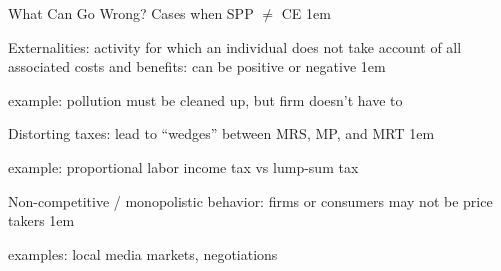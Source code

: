 \documentclass[11pt,aspectratio=43]{beamer}
\let\olditemize=\itemize
\let\endolditemize=\enditemize
\renewenvironment{itemize}{\olditemize \itemsep1em}{\endolditemize}
\let\oldenumerate=\enumerate
\let\endoldenumerate=\endenumerate
\renewenvironment{enumerate}{\oldenumerate \itemsep1em}{ \endoldenumerate}
\theoremstyle{definition}
\begin{document}
\begin{frame}{What Can Go Wrong? Cases when SPP $ \neq $ CE}
\label{slide:What_Can_Go_Wrong__Cases_when_SPP____neq___CE}
\begin{enumerate}
    \item Externalities: activity for which an individual does not take account of all associated costs and benefits: can be positive or negative
    \begin{itemize}
        \item example: pollution must be cleaned up, but firm doesn’t have to
    \end{itemize}
    \item Distorting taxes: lead to ``wedges'' between MRS, MP, and MRT
    \begin{itemize}
        \item example: proportional labor income tax vs lump-sum tax
    \end{itemize}
    \item Non-competitive / monopolistic behavior: firms or consumers may not be price takers
    \begin{itemize}
        \item examples: local media markets, negotiations
    \end{itemize}
\end{enumerate}
\end{frame}
\end{document}
